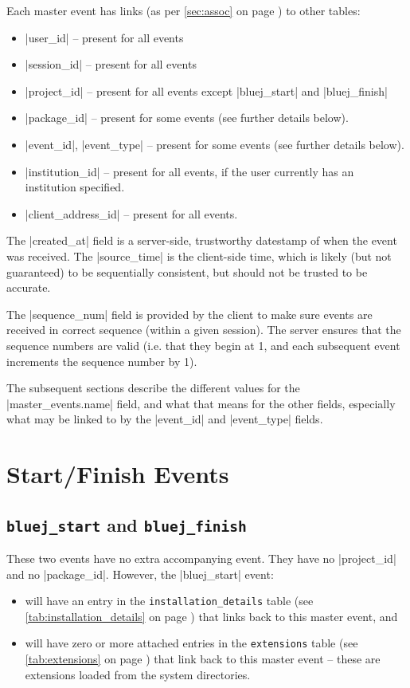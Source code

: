 \documentclass{book}
\newcommand{\myref}[1]{\autoref{#1} on page \pageref*{#1}}
\newcommand{\tabref}[1]{\lstinline|#1| table (see \myref{tab:#1})}
\begin{document}
Each master event has links (as per \myref{sec:assoc}) to other tables:
\begin{itemize}
\item |user_id| -- present for all events
\item |session_id| -- present for all events
\item |project_id| -- present for all events except |bluej_start| and |bluej_finish|
\item |package_id| -- present for some events (see further details below).
\item |event_id|, |event_type| -- present for some events (see further details below).
\item |institution_id| -- present for all events, if the user currently has an
  institution specified.
\item |client_address_id| -- present for all events.
\end{itemize}

The |created_at| field is a server-side, trustworthy datestamp of when
the event was received.  The |source_time| is the client-side time,
which is likely (but not guaranteed) to be sequentially consistent, but should
not be trusted to be accurate.

The |sequence_num| field is provided by the client to make sure events are
received in correct sequence (within a given session).  The server ensures
that the sequence numbers are valid (i.e. that they begin at 1, and each
subsequent event increments the sequence number by 1).

The subsequent sections describe the different values for the
|master_events.name| field, and what that means for the other fields,
especially what may be linked to by the |event_id| and |event_type| fields.


\section{Start/Finish Events}

\subsection{\lstinline|bluej_start| and \lstinline|bluej_finish|}

These two events have no extra accompanying event.  They have no
|project_id| and no |package_id|.  However, the |bluej_start| event:

\begin{itemize}
\item will have an entry in the \tabref{installation_details} that links back to this
  master event, and
\item  will have zero or more attached entries in the \tabref{extensions} that link back to this master event
-- these are extensions loaded from
the system directories.
\end{itemize}
\end{document}
